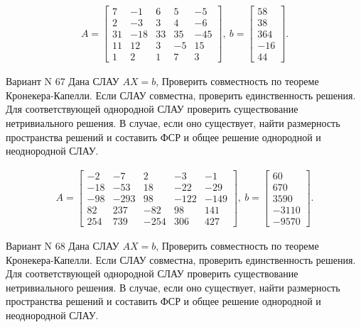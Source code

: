 \documentclass[11pt]{report}
\begin{document}
\begin{align*}
 A = \left[\begin{matrix}7 & -1 & 6 & 5 & -5\\2 & -3 & 3 & 4 & -6\\31 & -18 & 33 & 35 & -45\\11 & 12 & 3 & -5 & 15\\1 & 2 & 1 & 7 & 3\end{matrix}\right],
\ b = \left[\begin{matrix}58\\38\\364\\-16\\44\end{matrix}\right]. 
 \end{align*}

Вариант N 67
Дана СЛАУ $AX = b$,
Проверить совместность по теореме Кронекера-Капелли. Если СЛАУ совместна, проверить единственность решения.
Для соответствующей однородной СЛАУ проверить существование нетривиального решения. В случае, если оно существует,
найти размерность пространства решений и составить ФСР и общее решение однородной  и неоднородной СЛАУ.


\begin{align*}
 A = \left[\begin{matrix}-2 & -7 & 2 & -3 & -1\\-18 & -53 & 18 & -22 & -29\\-98 & -293 & 98 & -122 & -149\\82 & 237 & -82 & 98 & 141\\254 & 739 & -254 & 306 & 427\end{matrix}\right],
\ b = \left[\begin{matrix}60\\670\\3590\\-3110\\-9570\end{matrix}\right]. 
 \end{align*}

Вариант N 68
Дана СЛАУ $AX = b$,
Проверить совместность по теореме Кронекера-Капелли. Если СЛАУ совместна, проверить единственность решения.
Для соответствующей однородной СЛАУ проверить существование нетривиального решения. В случае, если оно существует,
найти размерность пространства решений и составить ФСР и общее решение однородной  и неоднородной СЛАУ.
\end{document}
